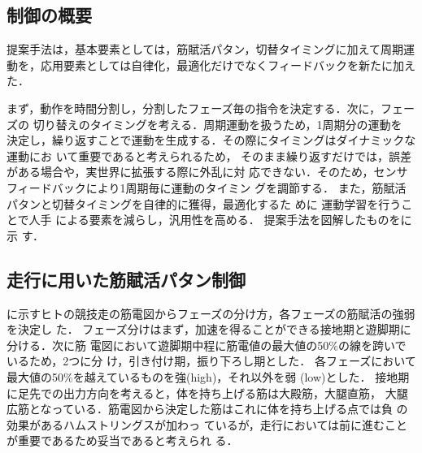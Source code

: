 \documentclass[10pt,a4paper]{jsarticle}
\begin{document}
\subsection{制御の概要}

提案手法は，基本要素としては，筋賦活パタン，切替タイミングに加えて周期運
動を，応用要素としては自律化，最適化だけでなくフィードバックを新たに加えた．

まず，動作を時間分割し，分割したフェーズ毎の指令を決定する．次に，フェーズの
切り替えのタイミングを考える．周期運動を扱うため，1周期分の運動を
決定し，繰り返すことで運動を生成する．その際にタイミングはダイナミックな運動にお
いて重要であると考えられるため，
そのまま繰り返すだけでは，誤差がある場合や，実世界に拡張する際に外乱に対
応できない．そのため，センサフィードバックにより1周期毎に運動のタイミン
グを調節する．
また，筋賦活パタンと切替タイミングを自律的に獲得，最適化するた
めに
運動学習を行うことで人手
による要素を減らし，汎用性を高める．
提案手法を図解したものをに示
す．

\vspace{-2mm}

\subsection{走行に用いた筋賦活パタン制御}

に示すヒトの競技走の筋電図からフェーズの分け方，各フェーズの筋賦活の強弱を決定し
た．
フェーズ分けはまず，加速を得ることができる接地期と遊脚期に分ける．次に筋
電図において遊脚期中程に筋電値の最大値の50$\%$の線を跨いでいるため，2つに分
け，引き付け期，振り下ろし期とした．
各フェーズにおいて最大値の50$\%$を越えているものを強(high)，それ以外を弱
(low)とした．
接地期に足先での出力方向\cite{Oshima2000:Robotic_Analyses_of_Output_Force_Distribution_Developed_by_Human_Limbs}を考えると，体を持ち上げる筋は大殿筋，大腿直筋，
大腿広筋となっている．筋電図から決定した筋はこれに体を持ち上げる点では負
の効果があるハムストリングスが加わっ
ているが，走行においては前に進むことが重要であるため妥当であると考えられ
る．
\end{document}
